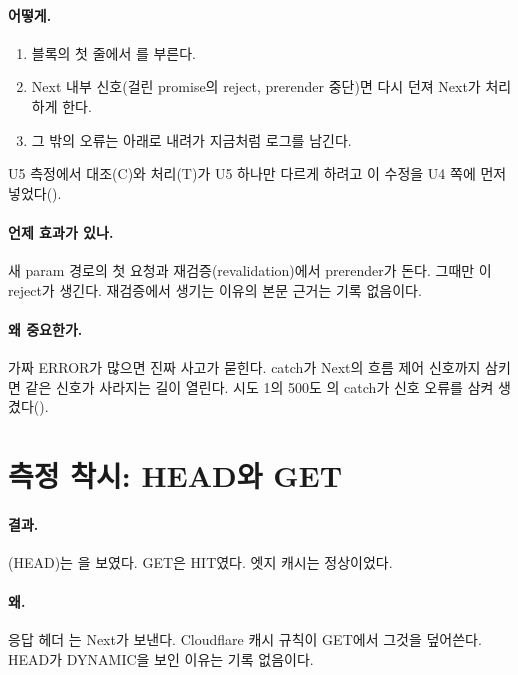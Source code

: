 \paragraph{어떻게.}
\begin{enumerate}[nosep]
  \item {} 블록의 첫 줄에서 를 부른다.
  \item Next 내부 신호(걸린 promise의 reject, prerender 중단)면 다시 던져 Next가 처리하게 한다.
  \item 그 밖의 오류는 아래로 내려가 지금처럼 로그를 남긴다.
\end{enumerate}
U5 측정에서 대조(C)와 처리(T)가 U5 하나만 다르게 하려고 이 수정을 U4 쪽에 먼저 넣었다().

\paragraph{언제 효과가 있나.}
새 param 경로의 첫 요청과 재검증(revalidation)에서 prerender가 돈다. 그때만 이 reject가 생긴다.
재검증에서 생기는 이유의 본문 근거는 기록 없음이다.

\paragraph{왜 중요한가.}
가짜 ERROR가 많으면 진짜 사고가 묻힌다.
catch가 Next의 흐름 제어 신호까지 삼키면  같은 신호가 사라지는 길이 열린다.
시도 1의 500도 의 catch가 신호 오류를 삼켜 생겼다().

\section{측정 착시: HEAD와 GET}\label{sec:le-headget}

\paragraph{결과.}
(HEAD)는 을 보였다. GET은 HIT였다.
엣지 캐시는 정상이었다.

\paragraph{왜.}
응답 헤더 는 Next가 보낸다.
Cloudflare 캐시 규칙이 GET에서 그것을 덮어쓴다. HEAD가 DYNAMIC을 보인 이유는 기록 없음이다.

